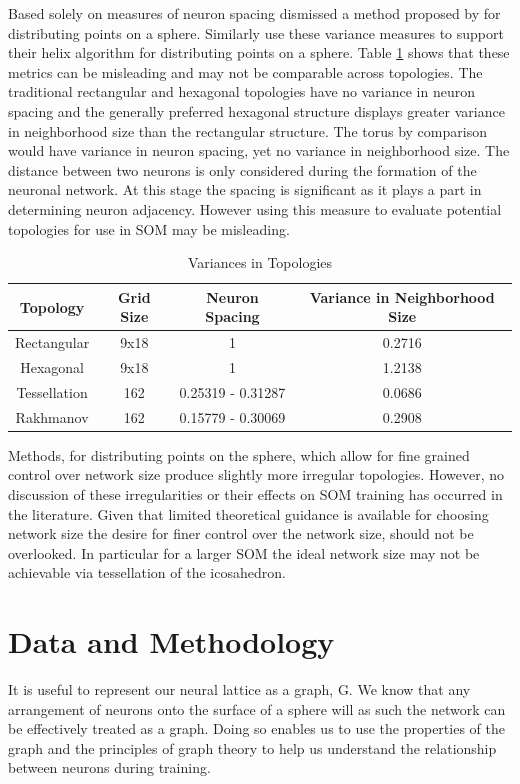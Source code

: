 \documentclass[11pt]{article}
\begin{document}
Based solely on measures of neuron spacing \cite{wu2005} dismissed a method
proposed by \cite{Rakhmanov94} for distributing points on a sphere.  Similarly
\cite{Nishio:2006fk} use these variance measures to support their helix
algorithm for distributing points on a sphere.  Table \ref{table1} shows that
these metrics can be misleading and may not be comparable across topologies.
The traditional rectangular and hexagonal topologies have no variance in neuron
spacing and the generally preferred hexagonal structure displays greater
variance in neighborhood size than the rectangular structure.  The torus by
comparison would have variance in neuron spacing, yet no variance in
neighborhood size.  The distance between two neurons is only considered during
the formation of the neuronal network.  At this stage the spacing is significant
as it plays a part in determining neuron adjacency. However using this measure
to evaluate potential topologies for use in SOM may be misleading.

\begin{table}[htbp]
\caption{Variances in Topologies}
\begin{center}
\begin{tabular}{|c|c|c|c|}
\hline
Topology&Grid Size&Neuron Spacing&Variance in Neighborhood Size\\
\hline
Rectangular&9x18&1&0.2716\\
Hexagonal&9x18&1&1.2138\\
Tessellation&162&0.25319 - 0.31287& 0.0686\\
Rakhmanov&162&0.15779 - 0.30069& 0.2908\\
\hline

\end{tabular}
\end{center}
\label{table1}
\end{table}%

Methods, for distributing points on the sphere, which allow for fine grained
control over network size produce slightly more irregular topologies.  However,
no discussion of these irregularities or their effects on SOM training has
occurred in the literature. Given that limited theoretical guidance is available
for choosing network size the desire for finer control over the network size,
should not be overlooked. In particular for a larger SOM the ideal network size
may not be achievable via tessellation of the icosahedron.

\section{Data and Methodology}
It is useful to represent our neural lattice as a graph, G.
We know that any arrangement of neurons onto the surface of a sphere will 
 as such the network can be effectively treated as a graph.  Doing so enables us to use the properties of the graph and the principles of graph theory to help us understand the relationship between neurons during training.
\end{document}
